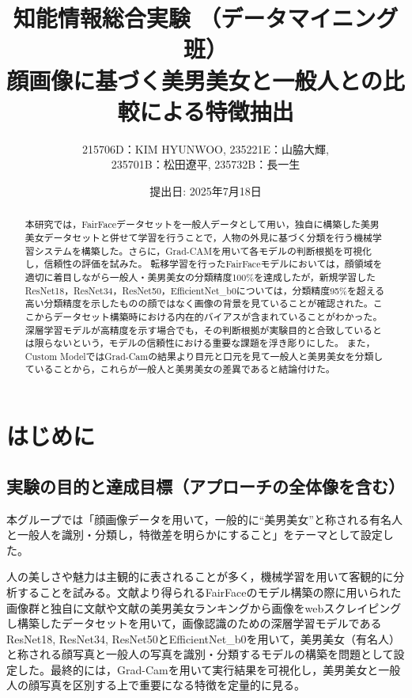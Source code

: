 \documentclass[a4paper,11pt,titlepage]{jsarticle}
\begin{document}
\title{知能情報総合実験 （データマイニング班） \\ 顔画像に基づく美男美女と一般人との比較による特徴抽出}
\author{215706D：KIM HYUNWOO, 235221E：山脇大輝,\\ 235701B：松田遼平, 235732B：長一生}
\date{提出日: 2025年7月18日}
\maketitle

\tableofcontents
\clearpage

\begin{abstract}
\label{label:abstract}
本研究では，FairFaceデータセットを一般人データとして用い，独自に構築した美男美女データセットと併せて学習を行うことで，人物の外見に基づく分類を行う機械学習システムを構築した。さらに，Grad-CAMを用いて各モデルの判断根拠を可視化し，信頼性の評価を試みた。
転移学習を行ったFairFaceモデルにおいては，顔領域を適切に着目しながら一般人・美男美女の分類精度100\%を達成したが，新規学習したResNet18，ResNet34，ResNet50，EfficientNet\_b0については，分類精度95\%を超える高い分類精度を示したものの顔ではなく画像の背景を見ていることが確認された。ここからデータセット構築時における内在的バイアスが含まれていることがわかった。深層学習モデルが高精度を示す場合でも，その判断根拠が実験目的と合致しているとは限らないという，モデルの信頼性における重要な課題を浮き彫りにした。
また，Custom ModelではGrad-Camの結果より目元と口元を見て一般人と美男美女を分類していることから，これらが一般人と美男美女の差異であると結論付けた。
\end{abstract} 


\section{はじめに}
\label{label:はじめに}
\subsection{実験の目的と達成目標（アプローチの全体像を含む）}
本グループでは「顔画像データを用いて，一般的に“美男美女”と称される有名人と一般人を識別・分類し，特徴差を明らかにすること」をテーマとして設定した。

人の美しさや魅力は主観的に表されることが多く，機械学習を用いて客観的に分析することを試みる。文献\cite{karkkainenFairFace}より得られるFairFaceのモデル構築の際に用いられた画像群と独自に文献\cite{bidanshi}や文献\cite{bijoshi}の美男美女ランキングから画像をwebスクレイピングし構築したデータセットを用いて，画像認識のための深層学習モデルであるResNet18, ResNet34, ResNet50とEfficientNet\_b0を用いて，美男美女（有名人）と称される顔写真と一般人の写真を識別・分類するモデルの構築を問題として設定した。最終的には，Grad-Camを用いて実行結果を可視化し，美男美女と一般人の顔写真を区別する上で重要になる特徴を定量的に見る。\par
\end{document}
